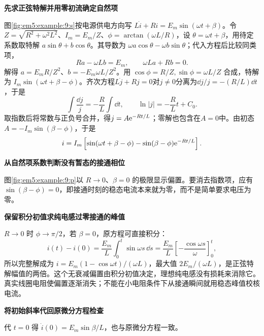 \begin{solution}\textbf{先求正弦特解并用零初流确定自然项}\par\nobreak
图\ref{fig:em5:example:9:s}按电源供电方向写 $L\dot i+Ri=E_m\sin(\omega t+\beta)$。令 $Z=\sqrt{R^2+\omega^2L^2}$、$I_m=E_m/Z$、$\phi=\arctan(\omega L/R)$，设 $\theta=\omega t+\beta$，用待定系数取特解 $a\sin\theta+b\cos\theta$。其导数为 $\omega a\cos\theta-\omega b\sin\theta$；代入方程后比较同类项，
\[
Ra-\omega Lb=E_m,\qquad \omega La+Rb=0.
\]
解得 $a=E_mR/Z^2$、$b=-E_m\omega L/Z^2$。用 $\cos\phi=R/Z,\sin\phi=\omega L/Z$ 合成，特解为 $I_m\sin(\omega t+\beta-\phi)$。齐次方程$L\dot j+Rj=0$对$j\ne0$分离为$\dd j/j=-(R/L)\dd t$，于是
\[
\int\frac{\dd j}{j}=-\frac RL\int\dd t,\qquad
\ln|j|=-\frac RLt+C_0.
\]
取指数后将常数与正负号合并，得$j=A\mathrm e^{-Rt/L}$；零解也包含在$A=0$中。由初态 $A=-I_m\sin(\beta-\phi)$，于是
\[i=I_m\left[\sin(\omega t+\beta-\phi)-\sin(\beta-\phi)\mathrm e^{-Rt/L}\right].\]



\par\medskip{}\noindent\textbf{从自然项系数判断没有暂态的接通相位}\par\nobreak
图\ref{fig:em5:example:9:p}以 $R\to0$、$\beta=0$ 的极限显示偏置。要消去指数项，应有 $\sin(\beta-\phi)=0$，即接通时刻的稳态电流本来就为零，而不是简单要求电压为零。



\par\medskip{}\noindent\textbf{保留积分初值求纯电感过零接通的峰值}\par\nobreak
$R\to0$ 时 $\phi\to\pi/2$，若 $\beta=0$，原方程可直接积分：
\[
i(t)-i(0)=\frac{E_m}{L}\int_0^t\sin\omega s\,\dd s
=\frac{E_m}{L}\left[-\frac{\cos\omega s}{\omega}\right]_0^t,
\]
所以完整解成为 $i=E_m(1-\cos\omega t)/(\omega L)$，最大值 $2E_m/(\omega L)$，是正弦特解幅值的两倍。这个无衰减偏置由积分初值决定，理想纯电感没有损耗来消除它。真实线圈电阻使偏置逐渐消失；不能在小电阻条件下从接通瞬间就用稳态峰值校核电流。

\par\medskip{}\noindent\textbf{将初始斜率代回原微分方程检查}\par\nobreak
代 $t=0$ 得 $\dot i(0)=E_m\sin\beta/L$，也与原微分方程一致。\end{solution}
